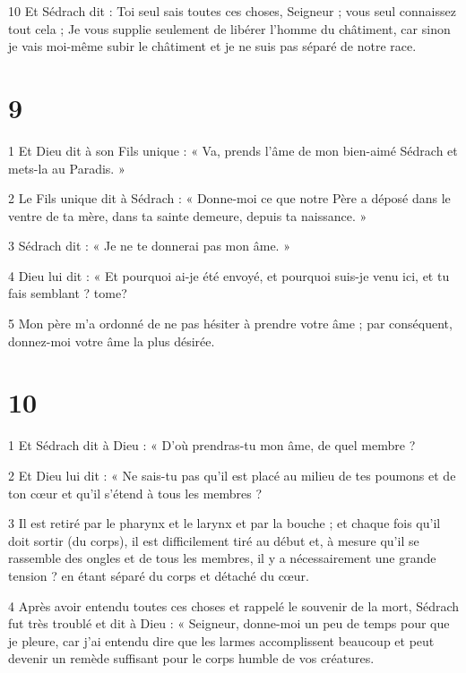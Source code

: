 \par 10 Et Sédrach dit : Toi seul sais toutes ces choses, Seigneur ; vous seul connaissez tout cela ; Je vous supplie seulement de libérer l'homme du châtiment, car sinon je vais moi-même subir le châtiment et je ne suis pas séparé de notre race.

\chapter{9}

\par 1 Et Dieu dit à son Fils unique : « Va, prends l'âme de mon bien-aimé Sédrach et mets-la au Paradis. »

\par 2 Le Fils unique dit à Sédrach : « Donne-moi ce que notre Père a déposé dans le ventre de ta mère, dans ta sainte demeure, depuis ta naissance. »

\par 3 Sédrach dit : « Je ne te donnerai pas mon âme. »

\par 4 Dieu lui dit : « Et pourquoi ai-je été envoyé, et pourquoi suis-je venu ici, et tu fais semblant ? tome?

\par 5 Mon père m'a ordonné de ne pas hésiter à prendre votre âme ; par conséquent, donnez-moi votre âme la plus désirée.

\chapter{10}

\par 1 Et Sédrach dit à Dieu : « D'où prendras-tu mon âme, de quel membre ?

\par 2 Et Dieu lui dit : « Ne sais-tu pas qu'il est placé au milieu de tes poumons et de ton cœur et qu'il s'étend à tous les membres ?

\par 3 Il est retiré par le pharynx et le larynx et par la bouche ; et chaque fois qu'il doit sortir (du corps), il est difficilement tiré au début et, à mesure qu'il se rassemble des ongles et de tous les membres, il y a nécessairement une grande tension ? en étant séparé du corps et détaché du cœur.

\par 4 Après avoir entendu toutes ces choses et rappelé le souvenir de la mort, Sédrach fut très troublé et dit à Dieu : « Seigneur, donne-moi un peu de temps pour que je pleure, car j'ai entendu dire que les larmes accomplissent beaucoup et peut devenir un remède suffisant pour le corps humble de vos créatures.


